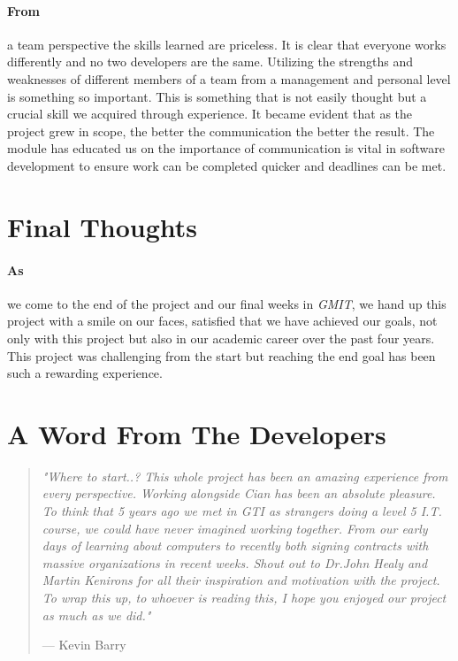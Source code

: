 \paragraph{From} a team perspective the skills learned are priceless. It is clear that everyone works differently and no two developers are the same. Utilizing the strengths and weaknesses of different members of a team from a management and personal level is something so important. This is something that is not easily thought but a crucial skill we acquired through experience. It became evident that as the project grew in scope, the better the communication the better the result. The module has educated us on the importance of communication is vital in software development to ensure work can be completed quicker and deadlines can be met.

\section{Final Thoughts} 
\paragraph{As} we come to the end of the project and our final weeks in \textit{GMIT}, we hand up this project with a smile on our faces, satisfied that we have achieved our goals, not only with this project but also in our academic career over the past four years. This project was challenging from the start but reaching the end goal has been such a rewarding experience.

\section{A Word From The Developers}

\begin{quote}
\textit{"Where to start..? This whole project has been an amazing experience from every perspective. Working alongside Cian has been an absolute pleasure. To think that 5 years ago we met in GTI as strangers doing a level 5 I.T. course, we could have never imagined working together. From our early days of learning about computers to recently both signing contracts with massive organizations in recent weeks. Shout out to Dr.John Healy and Martin Kenirons for all their inspiration and motivation with the project. To wrap this up, to whoever is reading this, I hope you enjoyed our project as much as we did."}\par\raggedleft--- \textup{Kevin Barry}
\end{quote}

